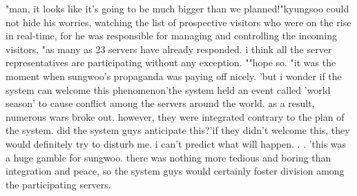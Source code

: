 "man, it looks like it's going to be much bigger than we planned!"kyungsoo could not hide his worries, watching the list of prospective visitors who were on the rise in real-time, for he was responsible for managing and controlling the incoming visitors.
"as many as 23 servers have already responded.
 i think all the server representatives are participating without any exception.
""hope so.
"it was the moment when sungwoo's propaganda was paying off nicely.
 'but i wonder if the system can welcome this phenomenon'the system held an event called 'world season' to cause conflict among the servers around the world.
 as a result, numerous wars broke out.
however, they were integrated contrary to the plan of the system.
 did the system guys anticipate this?'if they didn't welcome this, they would definitely try to disturb me.
 i can't predict what will happen.
.
.
'this was a huge gamble for sungwoo.
 there was nothing more tedious and boring than integration and peace, so the system guys would certainly foster division among the participating servers.
 
